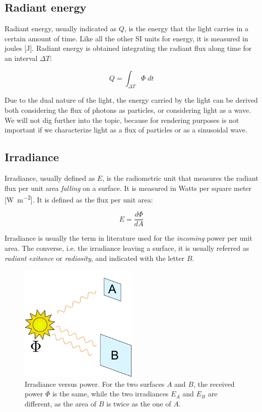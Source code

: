 \subsection{Radiant energy}
Radiant energy, usually indicated as $Q$, is the energy that the light carries in a certain amount of time. Like all the other SI units for energy, it is measured in joules [\si{\joule}]. Radiant energy is obtained integrating the radiant flux along time for an interval $\Delta T$:

$$
Q = \int_{\Delta T} \Phi \; dt
$$

Due to the dual nature of the light, the energy carried by the light can be derived both considering the flux of photons as particles, or considering light as a wave. We will not dig further into the topic, because for rendering purposes is not important if we characterize light as a flux of particles or as a sinusoidal wave.

\subsection{Irradiance}

Irradiance, usually defined as $E$, is the radiometric unit that measures the radiant flux per unit area \emph{falling} on a surface. It is measured in Watts per square meter [\si{\watt\per\square\meter}]. It is defined as the flux per unit area:

$$
E = \frac{d\Phi}{dA}
$$

Irradiance is usually the term in literature used for the \emph{incoming} power per unit area. The converse, i.e. the irradiance leaving a surface, it is usually referred as \emph{radiant exitance} or \emph{radiosity}, and indicated with the letter $B$.

\begin{figure}[!ht]
\centering
\includegraphics[width=0.5\textwidth]{images/irradiance.pdf}
\caption{Irradiance versus power. For the two surfaces $A$ and $B$, the received power $\Phi$ is the same, while the two irradiances $E_A$ and $E_B$ are different, as the area of $B$ is twice as the one of $A$.}
\label{fig:irradiance}
\end{figure}
 


